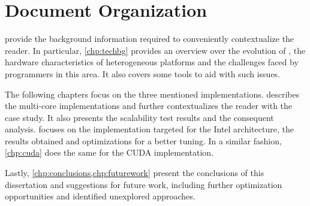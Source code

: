 \documentclass[../thesis]{subfiles}
\begin{document}
	\section{Document Organization}
	 provide the background information required to conveniently contextualize the reader. In particular, \cref{chp:techbg} provides an overview over the evolution of \hpc, the hardware characteristics of heterogeneous platforms and the challenges faced by programmers in this area. It also covers some tools to aid with such issues.

	The following chapters focus on the three mentioned implementations.  describes the multi-core implementations and further contextualizes the reader with the case study. It also presents the scalability test results and the consequent analysis.  focuses on the implementation targeted	 for the Intel \mic architecture, the results obtained and optimizations for a better tuning. In a similar fashion, \cref{chp:cuda} does the same for the CUDA implementation.

	Lastly, \cref{chp:conclusions,chp:futurework} present the conclusions of this dissertation and suggestions for future work, including further optimization opportunities and identified unexplored approaches.	
\end{document}
